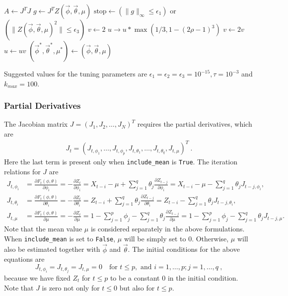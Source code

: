 \begin{algorithm}
\begin{algorithmic}[1]
					\State $A \leftarrow J^T J$
					\State $g \leftarrow J^T Z(\vec{\phi},\vec{\theta},\mu)$
					\State $ \text{stop} \leftarrow (\|g\|_{\infty} \le \epsilon_1)$ or $(\| Z(\vec{\phi},\vec{\theta},\mu)^2 \| \le \epsilon_3)$  
					\State $v \leftarrow 2$
					\State $u \rightarrow u * \max(1/3, 1 - (2\rho - 1)^3 )$
				\Else  {}
					\State $v \leftarrow 2 v$
					\State $u \leftarrow u v$
				\EndIf
			\EndIf
	\EndWhile
	\State $(\vec{\phi}^*,\vec{\theta}^*,\mu^*) \leftarrow (\vec{\phi},\vec{\theta},\mu)$
\end{algorithmic}
\label{alg: Levenberg-Marquardt}
\end{algorithm}

Suggested values for the tuning parameters are $\epsilon_1 = \epsilon_2 = \epsilon_3 = 10^{-15}, \tau = 10^{-3}$ and $k_{max} = 100$.  
\subsubsection{Partial Derivatives}\label{sec:partial der}
The Jacobian matrix $J = (J_{1}, J_{2}, \dots, J_N)^T$ requires the partial derivatives, which are 
\begin{align}
J_t = (J_{t, \phi_1}, \dots, J_{t,\phi_p}, J_{t,\theta_1}, \dots,
J_{t,\theta_q}, J_{t,\mu})^T\ .
\end{align}
Here the last term is present only when \texttt{include\_mean} is
\texttt{True}. 
The iteration relations for $J$ are
\begin{align}
J_{t, \phi_i} &= \frac{\partial F_t(\phi,\theta)}{\partial \phi_i} =
-\frac{\partial Z_t}{\partial \phi_i} = X_{t-i}-\mu + \sum_{j=1}^q
\theta_j \frac{\partial Z_{t - j}}{\partial \phi_i} = X_{t-i}-\mu - \sum_{j=1}^q
\theta_j J_{t-j,\phi_i}, \\
J_{t, \theta_i}&=\frac{\partial F_t(\phi,\theta)}{\partial \theta_i} =
-\frac{\partial Z_t}{\partial \theta_i} = Z_{t-i} + \sum_{j =1}^q
\theta_j \frac{\partial Z_{t - j}}{\partial \theta_i} = Z_{t-i} -
\sum_{j=1}^q \theta_j J_{t-j,\theta_i}, \\
J_{t, \mu} &=\frac{\partial F_t(\phi,\theta)}{\partial \mu} =
-\frac{\partial Z_t}{\partial \mu} = 1 -
\sum_{j=1}^p \phi_j - \sum_{j=1}^q \theta_j \frac{\partial
  Z_{t-j}}{\partial \mu} = 1 - \sum_{j=1}^p \phi_j - \sum_{j=1}^q
\theta_j J_{t-j,\mu}.
\end{align}
Note that the mean value $\mu$ is considered separately in the above
formulations. When \texttt{include\_mean} is set to \texttt{False}, $\mu$ will be simply
set to 0. Otherwise, $\mu$ will also be estimated together with
$\vec{\phi}$ and $\vec{\theta}$. The initial conditions for the above
equations are
\begin{equation}
J_{t,\phi_i} = J_{t,\theta_j} = J_{t,\mu} = 0 \quad \mbox{for }
t \leq p, \mbox{ and } i=1,\dots,p; j = 1, \dots, q\ , 
\end{equation}
because we have fixed $Z_t$ for $t\leq p$ to be a constant $0$ in the initial
condition. Note that $J$ is zero not only for $t\leq 
0$ but also for $t\leq p$.

